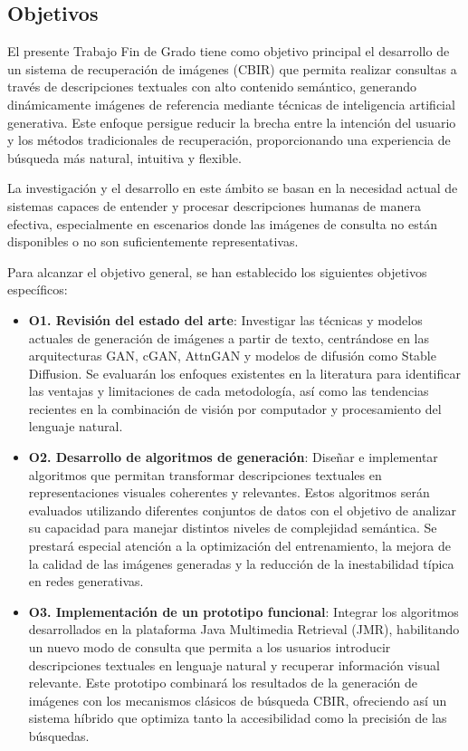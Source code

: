 \subsection{Objetivos}

El presente Trabajo Fin de Grado tiene como objetivo principal el desarrollo de un sistema de recuperación de imágenes (CBIR) que permita realizar consultas a través de descripciones textuales con alto contenido semántico, generando dinámicamente imágenes de referencia mediante técnicas de inteligencia artificial generativa. Este enfoque persigue reducir la brecha entre la intención del usuario y los métodos tradicionales de recuperación, proporcionando una experiencia de búsqueda más natural, intuitiva y flexible.

La investigación y el desarrollo en este ámbito se basan en la necesidad actual de sistemas capaces de entender y procesar descripciones humanas de manera efectiva, especialmente en escenarios donde las imágenes de consulta no están disponibles o no son suficientemente representativas.

Para alcanzar el objetivo general, se han establecido los siguientes objetivos específicos:

\begin{itemize}
    \item \textbf{O1. Revisión del estado del arte}: 
    Investigar las técnicas y modelos actuales de generación de imágenes a partir de texto, centrándose en las arquitecturas GAN, cGAN, AttnGAN y modelos de difusión como Stable Diffusion. Se evaluarán los enfoques existentes en la literatura para identificar las ventajas y limitaciones de cada metodología, así como las tendencias recientes en la combinación de visión por computador y procesamiento del lenguaje natural.
    
    \item \textbf{O2. Desarrollo de algoritmos de generación}: 
    Diseñar e implementar algoritmos que permitan transformar descripciones textuales en representaciones visuales coherentes y relevantes. Estos algoritmos serán evaluados utilizando diferentes conjuntos de datos con el objetivo de analizar su capacidad para manejar distintos niveles de complejidad semántica. Se prestará especial atención a la optimización del entrenamiento, la mejora de la calidad de las imágenes generadas y la reducción de la inestabilidad típica en redes generativas.
    
    \item \textbf{O3. Implementación de un prototipo funcional}: 
    Integrar los algoritmos desarrollados en la plataforma Java Multimedia Retrieval (JMR), habilitando un nuevo modo de consulta que permita a los usuarios introducir descripciones textuales en lenguaje natural y recuperar información visual relevante. Este prototipo combinará los resultados de la generación de imágenes con los mecanismos clásicos de búsqueda CBIR, ofreciendo así un sistema híbrido que optimiza tanto la accesibilidad como la precisión de las búsquedas.
\end{itemize}


